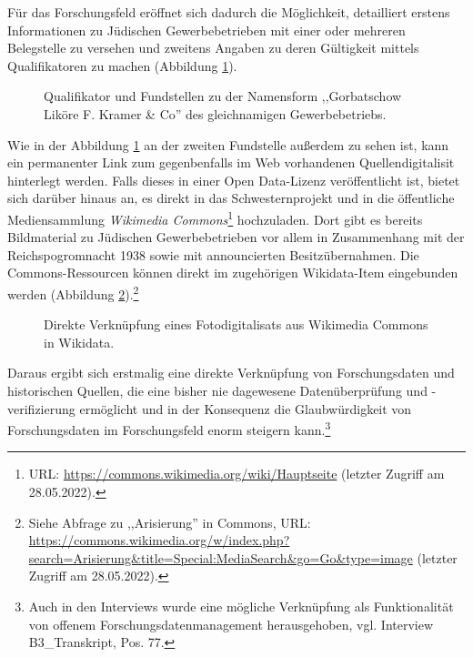 Für das Forschungsfeld eröffnet sich dadurch die Möglichkeit, detailliert erstens Informationen zu Jüdischen Gewerbebetrieben mit einer oder mehreren Belegstelle zu versehen und zweitens Angaben zu deren Gültigkeit mittels Qualifikatoren zu machen (Abbildung \ref{fig:wikidatareference}).

\begin{figure}[h]
    \centering
    \caption{Qualifikator und Fundstellen zu der Namensform ,,Gorbatschow Liköre F. Kramer \& Co'' des gleichnamigen Gewerbebetriebs.}
    \label{fig:wikidatareference}
\end{figure}

Wie in der Abbildung \ref{fig:wikidatareference} an der zweiten Fundstelle außerdem zu sehen ist, kann ein permanenter Link zum gegenbenfalls im Web vorhandenen Quellendigitalisit hinterlegt werden. Falls dieses in einer Open Data-Lizenz veröffentlicht ist, bietet sich darüber hinaus an, es direkt in das Schwesternprojekt und in die öffentliche Mediensammlung \textit{Wikimedia Commons}\footnote{URL: \url{https://commons.wikimedia.org/wiki/Hauptseite} (letzter Zugriff am 28.05.2022).} hochzuladen. Dort gibt es bereits Bildmaterial zu Jüdischen Gewerbebetrieben vor allem in Zusammenhang mit der Reichspogromnacht 1938 sowie mit announcierten Besitzübernahmen. Die Commons-Ressourcen können direkt im zugehörigen Wikidata-Item eingebunden werden (Abbildung \ref{fig:wikidatacommons}).\footnote{Siehe Abfrage zu ,,Arisierung'' in Commons, URL: \url{https://commons.wikimedia.org/w/index.php?search=Arisierung&title=Special:MediaSearch&go=Go&type=image} (letzter Zugriff am 28.05.2022).}

\begin{figure}[h]
    \centering
    \caption{Direkte Verknüpfung eines Fotodigitalisats aus Wikimedia Commons in Wikidata.}
    \label{fig:wikidatacommons}
\end{figure}

Daraus ergibt sich erstmalig eine direkte Verknüpfung von Forschungsdaten und historischen Quellen, die eine bisher nie dagewesene Datenüberprüfung und -verifizierung ermöglicht und in der Konsequenz die Glaubwürdigkeit von Forschungsdaten im Forschungsfeld enorm steigern kann.\footnote{Auch in den Interviews wurde eine mögliche Verknüpfung als Funktionalität von offenem Forschungsdatenmanagement herausgehoben, vgl. Interview B3\_Transkript, Pos. 77.} 

